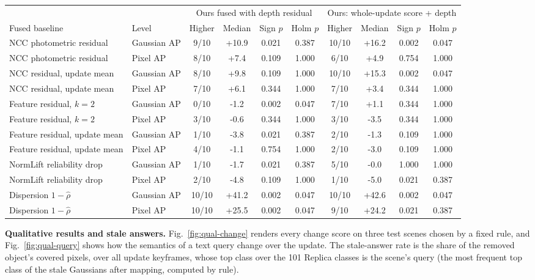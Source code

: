 \documentclass[journal]{IEEEtran}
\begin{document}
\begin{table}[t]
\vspace{4pt}
\begin{tabular}{@{}llcccccccc@{}}
\toprule
& & \multicolumn{4}{c}{Ours fused with depth residual} & \multicolumn{4}{c}{Ours: whole-update score + depth}\\
\cmidrule(lr){3-6}\cmidrule(l){7-10}
Fused baseline & Level & Higher & Median & Sign $p$ & Holm $p$ & Higher & Median & Sign $p$ & Holm $p$\\
\midrule
NCC photometric residual & Gaussian AP & 9/10 & +10.9 & 0.021 & 0.387 & 10/10 & +16.2 & 0.002 & 0.047\\
NCC photometric residual & Pixel AP & 8/10 & +7.4 & 0.109 & 1.000 & 6/10 & +4.9 & 0.754 & 1.000\\
NCC residual, update mean & Gaussian AP & 8/10 & +9.8 & 0.109 & 1.000 & 10/10 & +15.3 & 0.002 & 0.047\\
NCC residual, update mean & Pixel AP & 7/10 & +6.1 & 0.344 & 1.000 & 7/10 & +3.4 & 0.344 & 1.000\\
Feature residual, $k=2$ & Gaussian AP & 0/10 & -1.2 & 0.002 & 0.047 & 7/10 & +1.1 & 0.344 & 1.000\\
Feature residual, $k=2$ & Pixel AP & 3/10 & -0.6 & 0.344 & 1.000 & 3/10 & -3.5 & 0.344 & 1.000\\
Feature residual, update mean & Gaussian AP & 1/10 & -3.8 & 0.021 & 0.387 & 2/10 & -1.3 & 0.109 & 1.000\\
Feature residual, update mean & Pixel AP & 4/10 & -1.1 & 0.754 & 1.000 & 2/10 & -3.0 & 0.109 & 1.000\\
NormLift reliability drop & Gaussian AP & 1/10 & -1.7 & 0.021 & 0.387 & 5/10 & -0.0 & 1.000 & 1.000\\
NormLift reliability drop & Pixel AP & 2/10 & -4.8 & 0.109 & 1.000 & 1/10 & -5.0 & 0.021 & 0.387\\
Dispersion $1-\hat\rho$ & Gaussian AP & 10/10 & +41.2 & 0.002 & 0.047 & 10/10 & +42.6 & 0.002 & 0.047\\
Dispersion $1-\hat\rho$ & Pixel AP & 10/10 & +25.5 & 0.002 & 0.047 & 9/10 & +24.2 & 0.021 & 0.387\\
\bottomrule
\end{tabular}
\end{table}

\textbf{Qualitative results and stale answers.} Fig.~\ref{fig:qual-change} renders every change score on three test scenes chosen by a fixed rule, and Fig.~\ref{fig:qual-query} shows how the semantics of a text query change over the update. The stale-answer rate is the share of the removed object's covered pixels, over all update keyframes, whose top class over the 101 Replica classes is the scene's query (the most frequent top class of the stale Gaussians after mapping, computed by rule).
\end{document}
